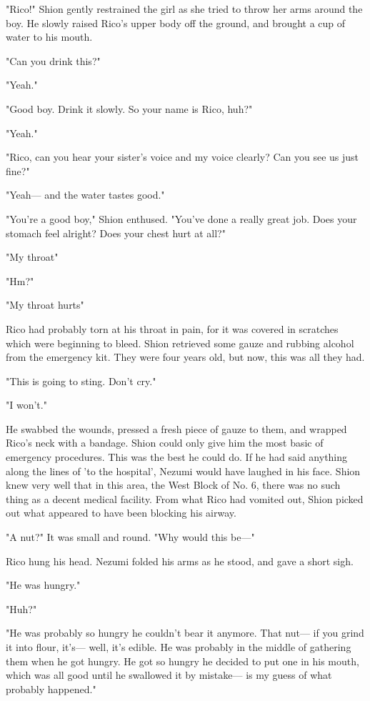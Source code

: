 "Rico!" Shion gently restrained the girl as she tried to throw her arms
around the boy. He slowly raised Rico's upper body off the ground, and
brought a cup of water to his mouth.

"Can you drink this?"

"Yeah."

"Good boy. Drink it slowly. So your name is Rico, huh?"

"Yeah."

"Rico, can you hear your sister's voice and my voice clearly? Can you
see us just fine?"

"Yeah--- and the water tastes good."

"You're a good boy," Shion enthused. "You've done a really great job.
Does your stomach feel alright? Does your chest hurt at all?"

"My throat\el "

"Hm?"

"My throat hurts\el "

Rico had probably torn at his throat in pain, for it was covered in
scratches which were beginning to bleed. Shion retrieved some gauze and
rubbing alcohol from the emergency kit. They were four years old, but
now, this was all they had.

"This is going to sting. Don't cry."

"I won't."

He swabbed the wounds, pressed a fresh piece of gauze to them, and
wrapped Rico's neck with a bandage. Shion could only give him the most
basic of emergency procedures. This was the best he could do. If he had
said anything along the lines of 'to the hospital', Nezumi would have
laughed in his face. Shion knew very well that in this area, the West
Block of No. 6, there was no such thing as a decent medical facility.
From what Rico had vomited out, Shion picked out what appeared to have
been blocking his airway.

"A nut?" It was small and round. "Why would this be---"

Rico hung his head. Nezumi folded his arms as he stood, and gave a short
sigh.

"He was hungry."

"Huh?"

"He was probably so hungry he couldn't bear it anymore. That nut--- if you
grind it into flour, it's--- well, it's edible. He was probably in the
middle of gathering them when he got hungry. He got so hungry he decided
to put one in his mouth, which was all good until he swallowed it by
mistake--- is my guess of what probably happened."

